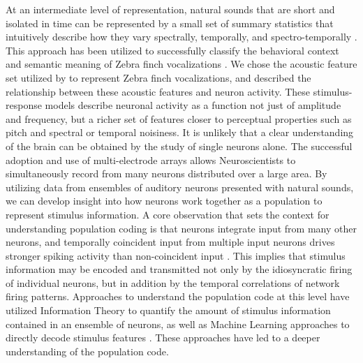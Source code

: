At an intermediate level of representation, natural sounds that are short and isolated in time can be represented by a small set of summary statistics that intuitively describe how they vary spectrally, temporally, and spectro-temporally \cite{REF}. This approach has been utilized to successfully classify the behavioral context and semantic meaning of Zebra finch vocalizations \cite{Elie2015b}. We chose the acoustic feature set utilized by \cite{Elie2015b} to represent Zebra finch vocalizations, and described the relationship between these acoustic features and neuron activity. These stimulus-response models describe neuronal activity as a function not just of amplitude and frequency, but a richer set of features closer to perceptual properties such as pitch and spectral or temporal noisiness.
It is unlikely that a clear understanding of the brain can be obtained by the study of single neurons alone. The successful adoption and use of multi-electrode arrays allows Neuroscientists to simultaneously record from many neurons distributed over a large area. By utilizing data from ensembles of auditory neurons presented with natural sounds, we can develop insight into how neurons work together as a population to represent stimulus information. A core observation that sets the context for understanding population coding is that neurons integrate input from many other neurons, and temporally coincident input from multiple input neurons drives stronger spiking activity than non-coincident input \cite{REF}. This implies that stimulus information may be encoded and transmitted not only by the idiosyncratic firing of individual neurons, but in addition by the temporal correlations of network firing patterns. Approaches to understand the population code at this level have utilized Information Theory to quantify the amount of stimulus information contained in an ensemble of neurons, as well as Machine Learning approaches to directly decode stimulus features \cite{Quiroga2009}. These approaches have led to a deeper understanding of the population code.

